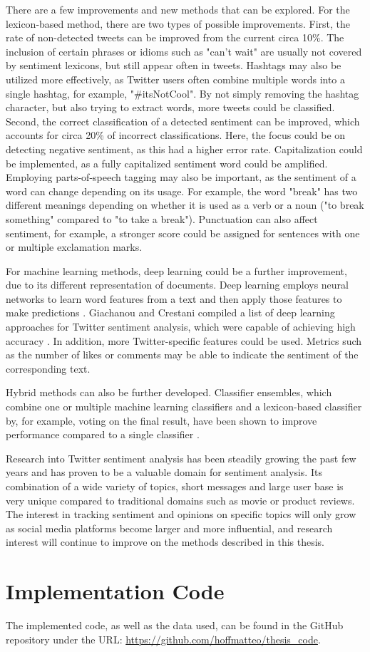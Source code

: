There are a few improvements and new methods that can be explored. For the lexicon-based method, there are two types of possible improvements. First, the rate of non-detected tweets can be improved from the current circa 10\%. The inclusion of certain phrases or idioms such as "can't wait" are usually not covered by sentiment lexicons, but still appear often in tweets. Hashtags may also be utilized more effectively, as Twitter users often combine multiple words into a single hashtag, for example, "\#itsNotCool". By not simply removing the hashtag character, but also trying to extract words, more tweets could be classified. Second, the correct classification of a detected sentiment can be improved, which accounts for circa 20\% of incorrect classifications. Here, the focus could be on detecting negative sentiment, as this had a higher error rate. Capitalization could be implemented, as a fully capitalized sentiment word could be amplified. Employing parts-of-speech tagging may also be important, as the sentiment of a word can change depending on its usage. For example, the word "break" has two different meanings depending on whether it is used as a verb or a noun ("to break something" compared to "to take a break"). Punctuation can also affect sentiment, for example, a stronger score could be assigned for sentences with one or multiple exclamation marks.


For machine learning methods, deep learning could be a further improvement, due to its different representation of documents. Deep learning employs neural networks to learn word features from a text and then apply those features to make predictions \cite{DBLP:journals/csur/GiachanouC16}. Giachanou and Crestani compiled a list of deep learning approaches for Twitter sentiment analysis, which were capable of achieving high accuracy \cite{DBLP:journals/csur/GiachanouC16}. In addition, more Twitter-specific features could be used. Metrics such as the number of likes or comments may be able to indicate the sentiment of the corresponding text.

Hybrid methods can also be further developed. Classifier ensembles, which combine one or multiple machine learning classifiers and a lexicon-based classifier by, for example, voting on the final result, have been shown to improve performance compared to a single classifier \cite{DBLP:journals/csur/GiachanouC16}.

Research into Twitter sentiment analysis has been steadily growing the past few years and has proven to be a valuable domain for sentiment analysis. Its combination of a wide variety of topics, short messages and large user base is very unique compared to traditional domains such as movie or product reviews. The interest in tracking sentiment and opinions on specific topics will only grow as social media platforms become larger and more influential, and research interest will continue to improve on the methods described in this thesis.

\chapter{Implementation Code}
The implemented code, as well as the data used, can be found in the GitHub repository under the URL: \url{https://github.com/hoffmatteo/thesis_code}.

